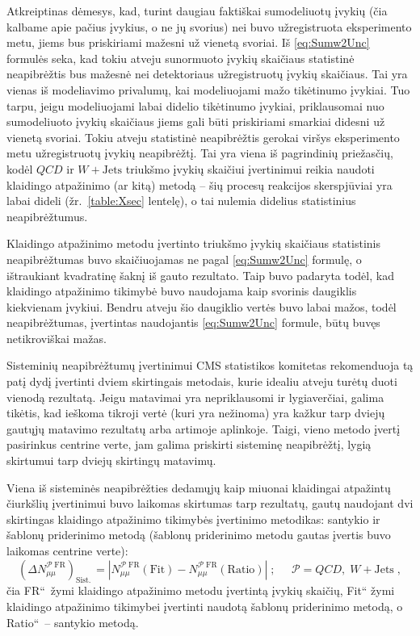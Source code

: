 \documentclass[a4paper, 12pt, oneside]{article}
\newcommand{\WJets}{W\! +\!\mathrm{Jets}}
\newcommand{\ltq}[1]{{\quotedblbase{}#1\textquotedblleft{}}}
\newcommand{\QCD}{QC\! D}
\newlength\q
\begin{document}
Atkreiptinas dėmesys, kad, turint daugiau faktiškai sumodeliuotų įvykių (čia kalbame apie pačius įvykius, o ne jų svorius)
nei buvo užregistruota eksperimento metu, jiems bus priskiriami mažesni už vienetą svoriai.
Iš \eqref{eq:Sumw2Unc} formulės seka, kad tokiu atveju sunormuoto įvykių skaičiaus statistinė neapibrėžtis bus mažesnė nei
detektoriaus užregistruotų įvykių skaičiaus.
Tai yra vienas iš modeliavimo privalumų, kai modeliuojami mažo tikėtinumo įvykiai.
Tuo tarpu, jeigu modeliuojami labai didelio tikėtinumo įvykiai, priklausomai nuo sumodeliuoto įvykių skaičiaus
jiems gali būti priskiriami smarkiai didesni už vienetą svoriai.
Tokiu atveju statistinė neapibrėžtis gerokai viršys eksperimento metu užregistruotų įvykių neapibrėžtį.
Tai yra viena iš pagrindinių priežasčių, kodėl $\QCD$ ir $\WJets$ triukšmo įvykių skaičiui įvertinimui reikia naudoti
klaidingo atpažinimo (ar kitą) metodą -- šių procesų reakcijos skerspjūviai yra labai dideli (žr.\ \ref{table:Xsec} lentelę),
o tai nulemia didelius statistinius neapibrėžtumus.

Klaidingo atpažinimo metodu įvertinto triukšmo įvykių skaičiaus statistinis neapibrėžtumas buvo skaičiuojamas ne pagal
\eqref{eq:Sumw2Unc} formulę, o ištraukiant kvadratinę šaknį iš gauto rezultato.
Taip buvo padaryta todėl, kad klaidingo atpažinimo tikimybė buvo naudojama kaip svorinis daugiklis kiekvienam įvykiui.
Bendru atveju šio daugiklio vertės buvo labai mažos, todėl neapibrėžtumas, įvertintas naudojantis \eqref{eq:Sumw2Unc}
formule, būtų buvęs netikroviškai mažas.

Sisteminių neapibrėžtumų įvertinimui CMS statistikos komitetas rekomenduoja tą patį dydį įvertinti dviem skirtingais metodais,
kurie idealiu atveju turėtų duoti vienodą rezultatą.
Jeigu matavimai yra nepriklausomi ir lygiaverčiai, galima tikėtis, kad ieškoma tikroji vertė (kuri yra nežinoma) yra kažkur
tarp dviejų gautųjų matavimo rezultatų arba artimoje aplinkoje.
Taigi, vieno metodo įvertį pasirinkus centrine verte, jam galima priskirti sisteminę neapibrėžtį, lygią skirtumui tarp
dviejų skirtingų matavimų.

Viena iš sisteminės neapibrėžties dedamųjų kaip miuonai klaidingai atpažintų čiurkšlių įvertinimui buvo laikomas skirtumas
tarp rezultatų, gautų naudojant dvi skirtingas klaidingo atpažinimo tikimybės įvertinimo metodikas: santykio ir šablonų
priderinimo metodą (šablonų priderinimo metodu gautas įvertis buvo laikomas centrine verte):
\begin{equation}
\label{eq:systUncFRmumu}
	(\Delta N_{\mu\mu}^{\mathcal{P} \; \mathrm{FR}})_{\mathrm{Sist.\,}} =
	\left| N_{\mu\mu}^{\mathcal{P} \; \mathrm{FR}}(\mathrm{Fit}) -
	N_{\mu\mu}^{\mathcal{P} \; \mathrm{FR}}(\mathrm{Ratio}) \right| \;  ;
	\;\;\;\;\; \mathcal{P} = \QCD, \; \WJets \; ,
\end{equation}
čia \ltq{FR}\ žymi klaidingo atpažinimo metodu įvertintą įvykių skaičių, \ltq{Fit} žymi klaidingo atpažinimo tikimybei
įvertinti naudotą šablonų priderinimo metodą, o \ltq{Ratio}\ -- santykio metodą.
\end{document}
